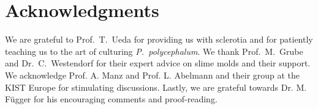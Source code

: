 \section{Acknowledgments}

	We are grateful to Prof.~T.~Ueda for providing us with sclerotia and for patiently teaching us to the art of culturing \emph{P.~polycephalum}. We thank Prof.~M.~Grube and Dr.~C.~Westendorf for their expert advice on slime molds and their support. We acknowledge Prof. A. Manz and Prof. L. Abelmann and their group at the KIST Europe for stimulating discussions. Lastly, we are grateful towards Dr. M. F\"ugger for his encouraging comments and proof-reading.

